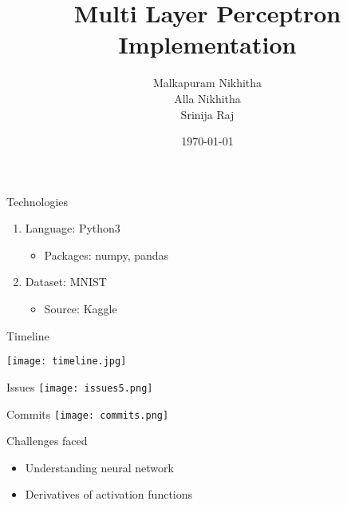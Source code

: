 \documentclass{beamer}
\title[Multi Layer Perceptron]{Multi Layer Perceptron \\ Implementation }
\author[Srinija Raj, A Nikhitha, M Nikhitha]{ Malkapuram Nikhitha \\ Alla Nikhitha \\ Srinija Raj}
\institute[WE]{ TalentSprint - WE program }
\date{\today}
\begin{document}
\begin{frame}
  \titlepage
\end{frame}

\begin{frame}{Technologies}
    \begin{enumerate}
        \item Language: Python3
        \vspace{10pt}
        \begin{itemize}
             \item Packages: numpy, pandas
        \end{itemize}
        \vspace{20pt}
      
       \item  Dataset: MNIST 
        \vspace{10pt}
        \begin{itemize}
            \item Source: Kaggle
        \end{itemize}
    \end{enumerate}
\end{frame}
 
\begin{frame}{Timeline }
  \begin{center}
     \texttt{[image: timeline.jpg]}
  \end{center}
\end{frame}

\begin{frame}{Issues}
\texttt{[image: issues5.png]}
\end{frame}

\begin{frame}{Commits}
\texttt{[image: commits.png]}
\end{frame}

\begin{frame}{Challenges faced}
    \begin{itemize}
        \item Understanding neural network
        \vspace{10pt}
        \vspace{10pt}
        \item Derivatives of activation functions
    \end{itemize}
\end{frame}
\end{document}
